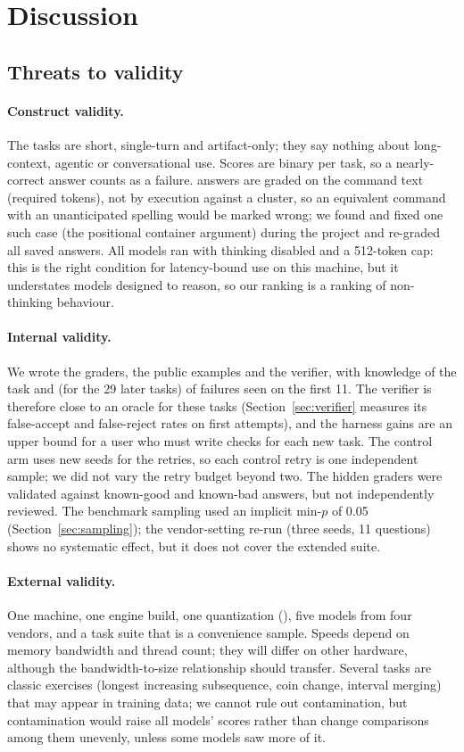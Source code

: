 \section{Discussion}
\label{sec:discussion}
\discussiontext

\subsection{Threats to validity}
\label{sec:threats}
\paragraph{Construct validity.} The tasks are short, single-turn and artifact-only; they say nothing about long-context, agentic or conversational use. Scores are binary per task, so a nearly-correct answer counts as a failure.
 answers are graded on the command text (required tokens), not by execution against a cluster, so an equivalent command with an unanticipated spelling would be marked wrong; we found and fixed one such case (the positional container argument) during the project and re-graded all saved answers.
All models ran with thinking disabled and a 512-token cap: this is the right condition for latency-bound use on this machine, but it understates models designed to reason, so our ranking is a ranking of non-thinking behaviour.
\paragraph{Internal validity.} We wrote the graders, the public examples and the verifier, with knowledge of the task and (for the 29 later tasks) of failures seen on the first 11. The verifier is therefore close to an oracle for these
tasks (Section~\ref{sec:verifier} measures its false-accept and false-reject rates on first attempts), and the harness gains are an upper bound for a user who must write checks for each new task. The control arm uses new seeds for the retries, so each control retry is one independent sample; we did not vary the retry budget beyond two.
The hidden graders were validated against known-good and known-bad answers, but not independently reviewed. The benchmark sampling used an implicit $\mathrm{min}\text{-}p$ of 0.05 (Section~\ref{sec:sampling}); the vendor-setting re-run (three seeds, 11 questions) shows no systematic effect, but it does not cover the extended suite.
\paragraph{External validity.} One machine, one engine build, one quantization (), five models from four vendors, and a task suite that is a convenience sample. Speeds depend on memory bandwidth and thread count; they will differ on other hardware, although the bandwidth-to-size
relationship should transfer. Several tasks are classic exercises (longest increasing subsequence, coin change, interval merging) that may appear in training data; we cannot rule out contamination, but contamination would raise all models' scores rather than change comparisons among them unevenly, unless some models saw more of it.
